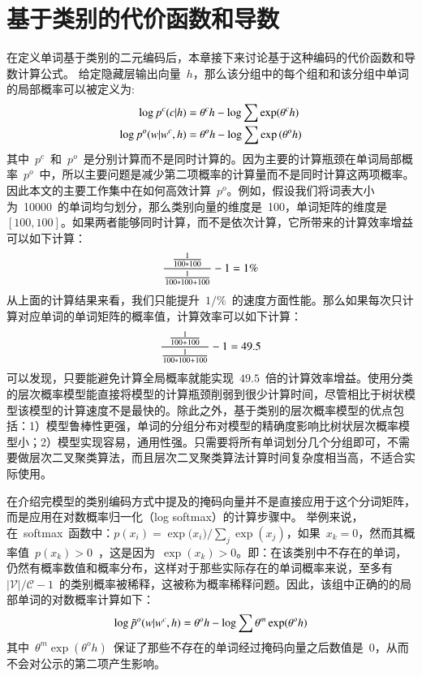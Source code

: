\section{基于类别的代价函数和导数}
在定义单词基于类别的二元编码后，本章接下来讨论基于这种编码的代价函数和导数计算公式。
给定隐藏层输出向量~$h$，那么该分组中的每个组和和该分组中单词的局部概率可以被定义为:
\begin{equation}
\setlength{\abovedisplayskip}{10pt}
\setlength{\belowdisplayskip}{10pt}
\begin{split}
\log p^c(c|h) &= \theta^c h-\log \sum{\exp( \theta^c h )} \\
\log p^o(w|w^c,h)&=\theta^o h -\log\sum\exp{(\theta^o h)}
\end{split}
\end{equation}
其中~$p^c$~和~$p^o$~是分别计算而不是同时计算的。因为主要的计算瓶颈在单词局部概率~$p^o$~中，所以主要问题是减少第二项概率的计算量而不是同时计算这两项概率。因此本文的主要工作集中在如何高效计算~$p^o$。例如，假设我们将词表大小为~10000~的单词均匀划分，那么类别向量的维度是~100，单词矩阵的维度是~$[100,100]$。如果两者能够同时计算，而不是依次计算，它所带来的计算效率增益可以如下计算：
\begin{equation}\label{equ:example}
\setlength{\abovedisplayskip}{10pt}
\setlength{\belowdisplayskip}{10pt}
  \frac{\frac{1}{100*100}}{\frac{1}{100*100+100}}-1=1\%
\end{equation}
从上面的计算结果来看，我们只能提升~$1/\%$~的速度方面性能。那么如果每次只计算对应单词的单词矩阵的概率值，计算效率可以如下计算：
\begin{equation}\label{equ:example2}
\setlength{\abovedisplayskip}{10pt}
\setlength{\belowdisplayskip}{10pt}
  \frac{\frac{1}{100+100}}{\frac{1}{100*100+100}}-1=49.5
\end{equation}
可以发现，只要能避免计算全局概率就能实现~$49.5$~倍的计算效率增益。使用分类的层次概率模型能直接将模型的计算瓶颈削弱到很少计算时间，尽管相比于树状模型该模型的计算速度不是最快的。除此之外，基于类别的层次概率模型的优点包括：1）模型鲁棒性更强，单词的分组分布对模型的精确度影响比树状层次概率模型小；2）模型实现容易，通用性强。只需要将所有单词划分几个分组即可，不需要做层次二叉聚类算法，而且层次二叉聚类算法计算时间复杂度相当高，不适合实际使用。



在介绍完模型的类别编码方式中提及的掩码向量并不是直接应用于这个分词矩阵，而是应用在对数概率归一化（log softmax）的计算步骤中。 举例来说，在~softmax~函数中：$p(x_i)={\exp({x_i}})/{\sum_j\exp(x_j)}$，如果~$x_k=0$，然而其概率值~$p(x_k)>0$~，这是因为~$\exp(x_k)>0$。即：在该类别中不存在的单词，仍然有概率数值和概率分布，这样对于那些实际存在的单词概率来说，至多有~$\mathcal{|V|/\mathcal{C}}-1$~的类别概率被稀释，这被称为概率稀释问题。因此，该组中正确的的局部单词的对数概率计算如下：
\begin{equation}
\setlength{\abovedisplayskip}{10pt}
\setlength{\belowdisplayskip}{10pt}
  \log \tilde p^o(w|w^c,h)=\theta^o h -\log\sum\theta^m\exp(\theta^o h)
\end{equation}
其中~$\theta^m\exp(\theta^o h)$~保证了那些不存在的单词经过掩码向量之后数值是~0，从而不会对公示的第二项产生影响。

